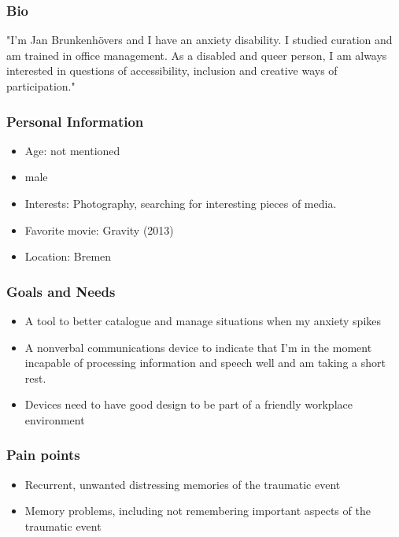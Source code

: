 \subsubsection*{Bio}
    "I’m Jan Brunkenhövers and I have an anxiety disability. I studied curation and am trained in office management. As a disabled and queer person, I am always interested in questions of accessibility, inclusion and creative ways of participation."
\subsubsection*{Personal Information}
\begin{itemize}
\item Age: not mentioned
\item male
\item Interests: Photography, searching for interesting pieces of media.
\item Favorite movie: Gravity (2013)
\item Location: Bremen 
\end{itemize}
\subsubsection*{Goals and Needs}
\begin{itemize}
    \item A tool to better catalogue and manage situations when my anxiety spikes
    \item A nonverbal communications device to indicate that I’m in the moment incapable of processing information and speech well and am taking a short rest.
    \item Devices need to have good design to be part of a friendly workplace environment   
\end{itemize}

\subsubsection*{Pain points}
\begin{itemize}
    \item Recurrent, unwanted distressing memories of the traumatic event
    \item Memory problems, including not remembering important aspects of the traumatic event
\end{itemize}

